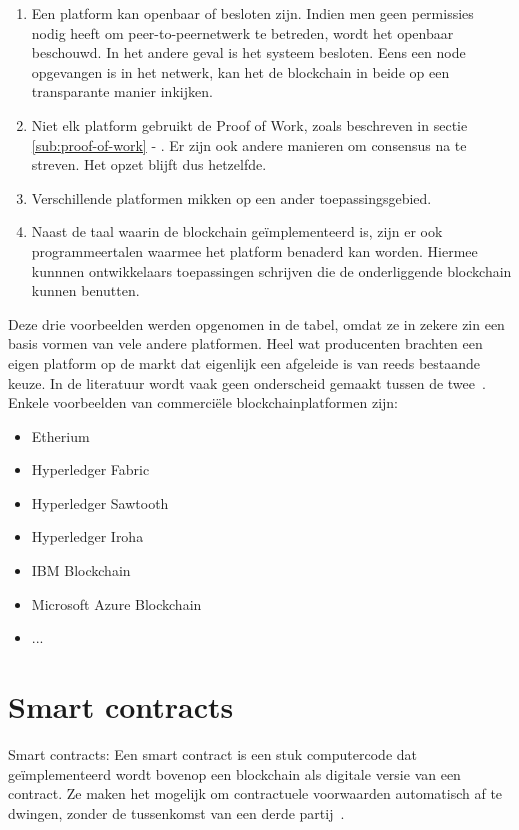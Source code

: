 \begin{enumerate}
	\item Een platform kan openbaar of besloten zijn. Indien men geen permissies nodig heeft om peer-to-peernetwerk te betreden, wordt het openbaar beschouwd. In het andere geval is het systeem besloten. Eens een node opgevangen is in het netwerk, kan het de blockchain in beide op een transparante manier inkijken.
	\item Niet elk platform gebruikt de Proof of Work, zoals beschreven in sectie \ref{sub:proof-of-work} - . Er zijn ook andere manieren om consensus na te streven. Het opzet blijft dus hetzelfde.
	\item Verschillende platformen mikken op een ander toepassingsgebied.
	\item Naast de taal waarin de blockchain geïmplementeerd is, zijn er ook programmeertalen waarmee het platform benaderd kan worden. Hiermee kunnnen ontwikkelaars toepassingen schrijven die de onderliggende blockchain kunnen benutten. 
\end{enumerate}
	
Deze drie voorbeelden werden opgenomen in de tabel, omdat ze in zekere zin een basis vormen van vele andere platformen. Heel wat producenten brachten een eigen platform op de markt dat eigenlijk een afgeleide is van reeds bestaande keuze. In de literatuur wordt vaak geen onderscheid gemaakt tussen de twee~\autocite{Gartner2022}. Enkele voorbeelden van commerciële blockchainplatformen zijn:
\begin{itemize}
	\item Etherium
	\item Hyperledger Fabric
	\item Hyperledger Sawtooth
	\item Hyperledger Iroha
	\item IBM Blockchain
	\item Microsoft Azure Blockchain
	\item ...
\end{itemize}


\section{Smart contracts}
Smart contracts:
Een smart contract is een stuk computercode dat geïmplementeerd wordt bovenop een blockchain als digitale versie van een contract. Ze maken het mogelijk om contractuele voorwaarden automatisch af te dwingen, zonder de tussenkomst van een derde partij~\autocite{Salem2008}.

